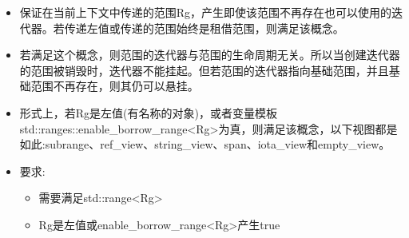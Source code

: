 
\begin{itemize}
\item
保证在当前上下文中传递的范围Rg，产生即使该范围不再存在也可以使用的迭代器。若传递左值或传递的范围始终是租借范围，则满足该概念。

\item
若满足这个概念，则范围的迭代器与范围的生命周期无关。所以当创建迭代器的范围被销毁时，迭代器不能挂起。但若范围的迭代器指向基础范围，并且基础范围不再存在，则其仍可以悬挂。

\item
形式上，若Rg是左值(有名称的对象)，或者变量模板std::ranges::enable\_borrow\_range<Rg>为真，则满足该概念，以下视图都是如此:subrange、ref\_view、string\_view、span、iota\_view和empty\_view。

\item
要求:

\begin{itemize}
\item
需要满足std::range<Rg>

\item
Rg是左值或enable\_borrow\_range<Rg>产生true
\end{itemize}
\end{itemize}


